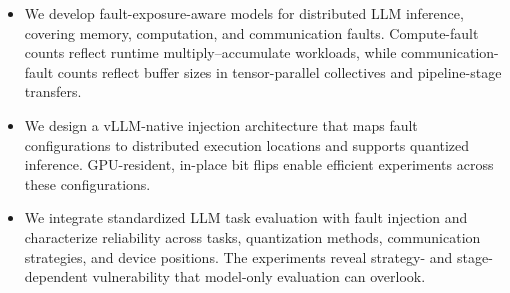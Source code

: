 \begin{itemize}
    \item We develop fault-exposure-aware models for distributed LLM inference, covering memory, computation, and communication faults. Compute-fault counts reflect runtime multiply--accumulate workloads, while communication-fault counts reflect buffer sizes in tensor-parallel collectives and pipeline-stage transfers.

    \item We design a vLLM-native injection architecture that maps fault configurations to distributed execution locations and supports quantized inference. GPU-resident, in-place bit flips enable efficient experiments across these configurations.

    \item We integrate standardized LLM task evaluation with fault injection and characterize reliability across tasks, quantization methods, communication strategies, and device positions. The experiments reveal strategy- and stage-dependent vulnerability that model-only evaluation can overlook.
\end{itemize}
